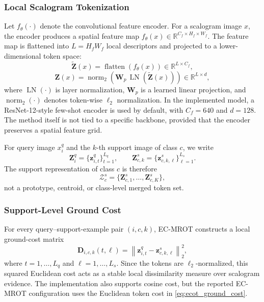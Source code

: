\documentclass[journal]{IEEEtran}
\newcommand{\method}{EC-MROT}
\newcommand{\R}{\mathbb{R}}
\newcommand{\1}{\mathbf{1}}
\begin{document}
\subsubsection{Local Scalogram Tokenization}
Let $f_\theta(\cdot)$ denote the convolutional feature encoder. For a scalogram image $x$, the encoder produces a spatial feature map $f_\theta(x)\in\R^{C_f\times H_f\times W_f}$. The feature map is flattened into $L=H_fW_f$ local descriptors and projected to a lower-dimensional token space:
\begin{equation}
    \tilde{\mathbf{Z}}(x)
    = \operatorname{flatten}(f_\theta(x)) \in \R^{L\times C_f},
\end{equation}
\begin{equation}
    \mathbf{Z}(x)
    = \operatorname{norm}_2\!\left(
        \mathbf{W}_p\,\operatorname{LN}(\tilde{\mathbf{Z}}(x))
      \right)
    \in \R^{L\times d},
    \label{eq:ecot_token_projection}
\end{equation}
where $\operatorname{LN}(\cdot)$ is layer normalization, $\mathbf{W}_p$ is a learned linear projection, and $\operatorname{norm}_2(\cdot)$ denotes token-wise $\ell_2$ normalization. In the implemented model, a ResNet-12-style few-shot encoder is used by default, with $C_f=640$ and $d=128$. The method itself is not tied to a specific backbone, provided that the encoder preserves a spatial feature grid.

For query image $x_i^q$ and the $k$-th support image of class $c$, we write
\begin{equation}
    \mathbf{Z}_i^q
    = \{\mathbf{z}_{i,t}^q\}_{t=1}^{L_q}, \qquad
    \mathbf{Z}_{c,k}^s
    = \{\mathbf{z}_{c,k,\ell}^s\}_{\ell=1}^{L_s}.
\end{equation}
The support representation of class $c$ is therefore
\begin{equation}
    \mathcal{Z}_c^s
    = \{\mathbf{Z}_{c,1}^s,\ldots,\mathbf{Z}_{c,K}^s\},
\end{equation}
not a prototype, centroid, or class-level merged token set.

\subsubsection{Support-Level Ground Cost}
For every query--support-example pair $(i,c,k)$, \method{} constructs a local ground-cost matrix
\begin{equation}
    \mathbf{D}_{i,c,k}(t,\ell)
    =
    \left\|
        \mathbf{z}_{i,t}^q-\mathbf{z}_{c,k,\ell}^s
    \right\|_2^2,
    \label{eq:ecot_ground_cost}
\end{equation}
where $t=1,\ldots,L_q$ and $\ell=1,\ldots,L_s$. Since the tokens are $\ell_2$-normalized, this squared Euclidean cost acts as a stable local dissimilarity measure over scalogram evidence. The implementation also supports cosine cost, but the reported \method{} configuration uses the Euclidean token cost in \eqref{eq:ecot_ground_cost}.
\end{document}
